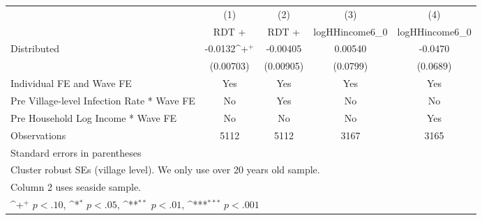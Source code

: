 {
\def\sym#1{\ifmmode^{#1}\else\(^{#1}\)\fi}
\begin{tabular}{l*{4}{c}}
\hline\hline
                    &\multicolumn{1}{c}{(1)}&\multicolumn{1}{c}{(2)}&\multicolumn{1}{c}{(3)}&\multicolumn{1}{c}{(4)}\\
                    &\multicolumn{1}{c}{RDT +}&\multicolumn{1}{c}{RDT +}&\multicolumn{1}{c}{logHHincome6\_0}&\multicolumn{1}{c}{logHHincome6\_0}\\
\hline
Distributed         &     -0.0132\sym{+}  &    -0.00405         &     0.00540         &     -0.0470         \\
                    &   (0.00703)         &   (0.00905)         &    (0.0799)         &    (0.0689)         \\
[1em]
Individual FE and Wave FE &         Yes         &         Yes         &         Yes         &         Yes         \\
[1em]
Pre Village-level Infection Rate * Wave FE&          No         &         Yes         &          No         &          No         \\
[1em]
Pre Household Log Income * Wave FE&          No         &          No         &          No         &         Yes         \\
\hline
Observations        &        5112         &        5112         &        3167         &        3165         \\
\hline\hline
\multicolumn{5}{l}{\footnotesize Standard errors in parentheses}\\
\multicolumn{5}{l}{\footnotesize Cluster robust SEs (village level). We only use over 20 years old sample.}\\
\multicolumn{5}{l}{\footnotesize Column 2 uses seaside sample.}\\
\multicolumn{5}{l}{\footnotesize \sym{+} \(p<.10\), \sym{*} \(p<.05\), \sym{**} \(p<.01\), \sym{***} \(p<.001\)}\\
\end{tabular}
}
